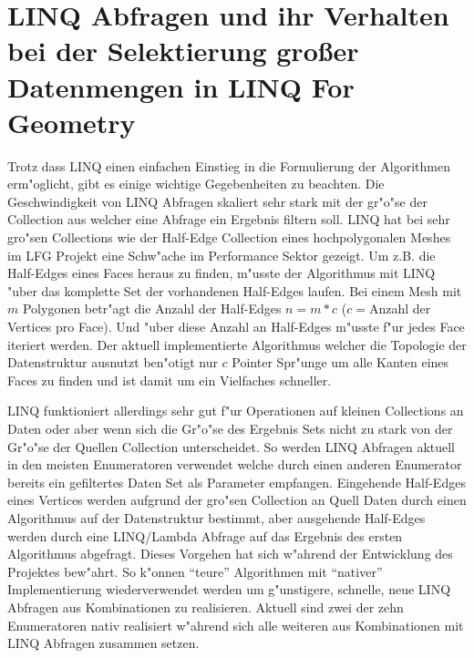 \documentclass[pagesize, paper=a4, fontsize=12pt,titlepage=true, headings=small, headnosepline, abstractoff, liststotoc, nochapterprefix, plainheadsepline]{scrreprt}
\newcommand{\LFG}{LINQ For Geometry}
\begin{document}
	\section {LINQ Abfragen und ihr Verhalten bei der Selektierung großer Datenmengen in \LFG}
Trotz dass LINQ einen einfachen Einstieg in die Formulierung der Algorithmen erm"oglicht, gibt es einige wichtige Gegebenheiten zu beachten. Die Geschwindigkeit von LINQ Abfragen skaliert sehr stark mit der gr"o"se der Collection aus welcher eine Abfrage ein Ergebnis filtern soll. LINQ hat bei sehr gro"sen Collections wie der Half-Edge Collection eines hochpolygonalen Meshes im LFG Projekt eine Schw"ache im Performance Sektor gezeigt. Um z.B. die Half-Edges eines Faces heraus zu finden, m"usste der Algorithmus mit LINQ "uber das komplette Set der vorhandenen Half-Edges laufen. Bei einem Mesh mit $m$ Polygonen betr"agt die Anzahl der Half-Edges $n = m * c$ ($c = $Anzahl der Vertices pro Face). Und "uber diese Anzahl an Half-Edges m"usste f"ur jedes Face iteriert werden. Der aktuell implementierte Algorithmus welcher die Topologie der Datenstruktur ausnutzt ben"otigt nur $c$ Pointer Spr"unge um alle Kanten eines Faces zu finden und ist damit um ein Vielfaches schneller.
\newline

LINQ funktioniert allerdings sehr gut f"ur Operationen auf kleinen Collections an Daten oder aber wenn sich die Gr"o"se des Ergebnis Sets nicht zu stark von der Gr"o"se der Quellen Collection unterscheidet. So werden LINQ Abfragen aktuell in den meisten Enumeratoren verwendet welche durch einen anderen Enumerator bereits ein gefiltertes Daten Set als Parameter empfangen. Eingehende Half-Edges eines Vertices werden aufgrund der gro"sen Collection an Quell Daten durch einen Algorithmus auf der Datenstruktur bestimmt, aber ausgehende Half-Edges werden durch eine LINQ/Lambda Abfrage auf das Ergebnis des ersten Algorithmus abgefragt. Dieses Vorgehen hat sich w"ahrend der Entwicklung des Projektes bew"ahrt. So k"onnen "`teure"' Algorithmen mit "`nativer"' Implementierung wiederverwendet werden um g"unstigere, schnelle, neue LINQ Abfragen aus Kombinationen zu realisieren. Aktuell sind zwei der zehn Enumeratoren nativ realisiert w"ahrend sich alle weiteren aus Kombinationen mit LINQ Abfragen zusammen setzen.
\newline
\end{document}
